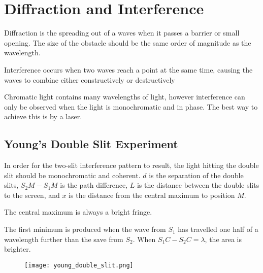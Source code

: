\section{Diffraction and Interference} \label{15/05/2025}
	
	Diffraction is the spreading out of a waves when it passes a barrier or small opening. The size of the obstacle should be the same order of magnitude as the wavelength.

	Interference occurs when two waves reach a point at the same time, causing the waves to combine either constructively or destructively

	Chromatic light contains many wavelengths of light, however interference can only be observed when the light is monochromatic and in phase. The best way to achieve this is by a laser.

	\subsection{Young's Double Slit Experiment}
	
		In order for the two-slit interference pattern to result, the light hitting the double slit should be monochromatic and coherent. $d$ is the separation of the double slits, $S_{2}M - S_{1}M$ is the path difference, $L$ is the distance between the double slits to the screen, and $x$ is the distance from the central maximum to position $M$.

		The central maximum is always a bright fringe.

		The first minimum is produced when the wave from $S_1$ has travelled one half of a wavelength further than the save from $S_2$. When $S_1 C - S_2 C = \lambda$, the area is brighter.

		\begin{figure}[H]
			\centering
			\texttt{[image: young\_double\_slit.png]}
		\end{figure}

	
